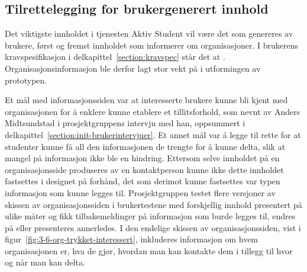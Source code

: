 \subsection{Tilrettelegging for brukergenerert innhold}
Det viktigste innholdet i tjenesten Aktiv Student vil være det som genereres av brukere, først og fremst innholdet som informerer om organisasjoner. I brukerens kravspesifikasjon i delkapittel~\ref{section:kravspec} står det at . Organisasjonsinformasjon ble derfor lagt stor vekt på i utformingen av prototypen.

Et mål med informasjonssiden var at interesserte brukere kunne bli kjent med organisasjonen for å enklere kunne etablere et tillitsforhold, som nevnt av Anders Midtsundstad i prosjektgruppens intervju med han, oppsummert i delkapittel~\ref{section:init-brukerintervjuer}. Et annet mål var å legge til rette for at studenter kunne få all den informasjonen de trengte for å kunne delta, slik at mangel på informasjon ikke ble en hindring. Ettersom selve innholdet på en organisasjonsside produseres av en kontaktperson kunne ikke dette innholdet fastsettes i designet på forhånd, det som derimot kunne fastsettes var typen informasjon som kunne legges til. Prosjektgruppen testet flere versjoner av skissen av organisasjonssiden i brukertestene med forskjellig innhold presentert på ulike måter og fikk tilbakemeldinger på informasjon som burde legges til, endres på eller presenteres annerledes. I den endelige skissen av organisasjonssiden, vist i figur~\ref{fig:3-6-org-trykket-interessert}, inkluderes informasjon om hvem organisasjonen er, hva de gjør, hvordan man kan kontakte dem i tillegg til hvor og når man kan delta.

